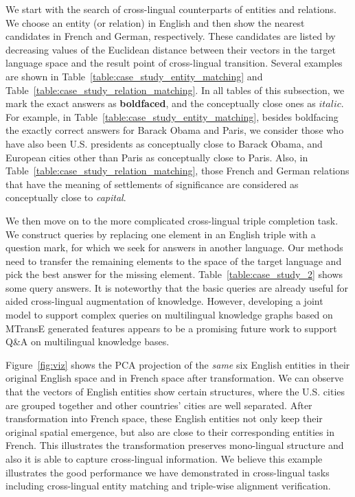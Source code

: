 \documentclass{article}
\begin{document}
We start with the search of cross-lingual counterparts of entities and relations.		
We choose an entity (or relation) in English and then show the nearest candidates in French and German, respectively. 		
These candidates are listed by decreasing values of the Euclidean distance between their vectors in the target language space and the result point of cross-lingual transition.		
Several examples are shown in Table~\ref{table:case_study_entity_matching} and Table~\ref{table:case_study_relation_matching}.
In all tables of this subsection, we mark the exact answers as \textbf{boldfaced}, and the conceptually close ones as $italic$.
For example, in Table~\ref{table:case_study_entity_matching}, besides boldfacing the exactly correct answers for Barack Obama and Paris, we consider those who have also been U.S. presidents as conceptually close to Barack Obama, and European cities other than Paris as conceptually close to Paris. Also, in Table~\ref{table:case_study_relation_matching}, those French and German relations that have the meaning of settlements of significance are considered as conceptually close to \emph{capital}.
\par


We then move on to the more complicated cross-lingual triple completion task.		
We construct queries by replacing one element in an English triple with a question mark,
for which we seek for answers in another language.
Our methods need to transfer the remaining elements to the space of the target language		
and pick the best answer for the missing element.		
Table~\ref{table:case_study_2} shows some query answers.
It is noteworthy that the basic queries are already useful for aided cross-lingual augmentation of knowledge.
However, developing a joint model to support complex queries on multilingual knowledge graphs based on MTransE generated features appears to be a promising future work to support Q\&A on multilingual knowledge bases.
\par

Figure~\ref{fig:viz} shows the PCA projection of the {\em same} six English entities in their original English space and in French space after transformation.
We can observe that the vectors of English entities show certain structures, where the U.S. cities are grouped together and other countries' cities are well separated.
After transformation into French space, these English entities not only keep their original spatial emergence, but also are close to their corresponding entities in French.
This illustrates the transformation preserves mono-lingual structure and also it is able to capture cross-lingual information.
We believe this example illustrates the good performance we have demonstrated in cross-lingual tasks including cross-lingual entity matching and triple-wise alignment verification.
\par
\end{document}
